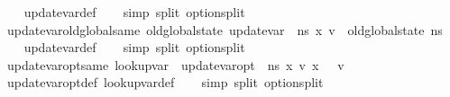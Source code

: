 \begin{isabellebody}
%
\isadelimproof
\ \ %
\endisadelimproof
%
\isatagproof
{}\isamarkupfalse%
\ update{\isacharunderscore}{\kern0pt}var{\isacharunderscore}{\kern0pt}def\isanewline
\ \ \isamarkupfalse%
\ {\isacharparenleft}{\kern0pt}simp\ split{\isacharcolon}{\kern0pt}\ option{\isachardot}{\kern0pt}split{\isacharparenright}{\kern0pt}%
\endisatagproof
{\isafoldproof}%
%
\isadelimproof
\isanewline
%
\endisadelimproof
\isanewline
{}\isamarkupfalse%
\ update{\isacharunderscore}{\kern0pt}var{\isacharunderscore}{\kern0pt}old{\isacharunderscore}{\kern0pt}global{\isacharunderscore}{\kern0pt}same{\isacharcolon}{\kern0pt}\ {\isachardoublequoteopen}old{\isacharunderscore}{\kern0pt}global{\isacharunderscore}{\kern0pt}state\ {\isacharparenleft}{\kern0pt}update{\isacharunderscore}{\kern0pt}var\ {\isasymLambda}\ n{\isacharunderscore}{\kern0pt}s\ x\ v{\isacharparenright}{\kern0pt}\ {\isacharequal}{\kern0pt}\ old{\isacharunderscore}{\kern0pt}global{\isacharunderscore}{\kern0pt}state\ n{\isacharunderscore}{\kern0pt}s{\isachardoublequoteclose}\isanewline
%
\isadelimproof
\ \ %
\endisadelimproof
%
\isatagproof
{}\isamarkupfalse%
\ update{\isacharunderscore}{\kern0pt}var{\isacharunderscore}{\kern0pt}def\isanewline
\ \ \isamarkupfalse%
\ {\isacharparenleft}{\kern0pt}simp\ split{\isacharcolon}{\kern0pt}\ option{\isachardot}{\kern0pt}split{\isacharparenright}{\kern0pt}%
\endisatagproof
{\isafoldproof}%
%
\isadelimproof
\isanewline
%
\endisadelimproof
\isanewline
{}\isamarkupfalse%
\ update{\isacharunderscore}{\kern0pt}var{\isacharunderscore}{\kern0pt}opt{\isacharunderscore}{\kern0pt}same{\isacharcolon}{\kern0pt}\ {\isachardoublequoteopen}lookup{\isacharunderscore}{\kern0pt}var\ {\isasymLambda}\ {\isacharparenleft}{\kern0pt}update{\isacharunderscore}{\kern0pt}var{\isacharunderscore}{\kern0pt}opt\ {\isasymLambda}\ n{\isacharunderscore}{\kern0pt}s\ x\ v{\isacharparenright}{\kern0pt}\ x\ {\isacharequal}{\kern0pt}\ \ v{\isachardoublequoteclose}\isanewline
%
\isadelimproof
\ \ %
\endisadelimproof
%
\isatagproof
{}\isamarkupfalse%
\ update{\isacharunderscore}{\kern0pt}var{\isacharunderscore}{\kern0pt}opt{\isacharunderscore}{\kern0pt}def\ lookup{\isacharunderscore}{\kern0pt}var{\isacharunderscore}{\kern0pt}def\isanewline
\ \ \isamarkupfalse%
\ {\isacharparenleft}{\kern0pt}simp\ split{\isacharcolon}{\kern0pt}\ option{\isachardot}{\kern0pt}split{\isacharparenright}{\kern0pt}%
\endisatagproof
{\isafoldproof}%
%
\isadelimproof
\isanewline
%
\endisadelimproof

\end{isabellebody}
